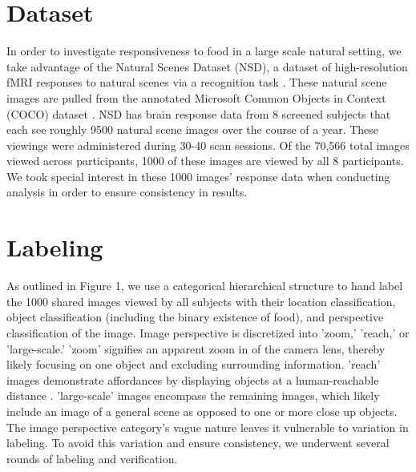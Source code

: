 \documentclass[../thesis.tex]{subfiles}
\begin{document}

\section{Dataset}

In order to investigate responsiveness to food in a large scale natural setting, we take advantage of the Natural Scenes Dataset (NSD), a dataset of high-resolution fMRI responses to natural scenes via a recognition task \cite{Allen}. These natural scene images are pulled from the annotated Microsoft Common Objects in Context (COCO) dataset \cite{lin2014microsoft}. NSD has brain response data from 8 screened subjects that each see roughly 9500 natural scene images over the course of a year. These viewings were administered during 30-40 scan sessions. Of the 70,566 total images viewed across participants, 1000 of these images are viewed by all 8 participants. We took special interest in these 1000 images' response data when conducting analysis in order to ensure consistency in results. 


\section{Labeling}

As outlined in Figure 1, we use a categorical hierarchical structure to hand label the 1000 shared images viewed by all subjects with their location classification, object classification (including the binary existence of food), and perspective classification of the image. Image perspective is discretized into 'zoom,' 'reach,' or 'large-scale.' 'zoom' signifies an apparent zoom in of the camera lens, thereby likely focusing on one object and excluding surrounding information. 'reach' images demonstrate affordances by displaying objects at a human-reachable distance \cite{josephs2021world}. 'large-scale' images encompass the remaining images, which likely include an image of a general scene as opposed to one or more close up objects. The image perspective category's vague nature leaves it vulnerable to variation in labeling. To avoid this variation and ensure consistency, we underwent several rounds of labeling and verification. 
\end{document}

